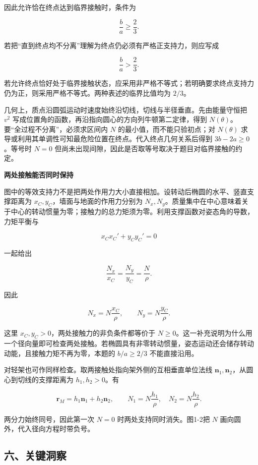 \documentclass[12pt,a4paper,UTF8]{ctexart}
\begin{document}
因此允许恰在终点达到临界接触时，条件为

\[\boxed{\frac ba\geq\frac23}.\]

若把``直到终点均不分离''理解为终点仍必须有严格正支持力，则应写成

\[\boxed{\frac ba>\frac23}.\]

若允许终点恰好处于临界接触状态，应采用非严格不等式；若明确要求终点支持力仍为正，则采用严格不等式。两种表述的临界比值均为
\(2/3\)。

几何上，质点沿圆弧运动时速度始终沿切线，切线与半径垂直。先由能量守恒把
\(v^2\) 写成位置角的函数，再沿指向圆心的方向列牛顿第二定律，得到
\(N(\theta)\)。要``全过程不分离''，必须求区间内 \(N\)
的最小值，而不能只验初点；对 \(N(\theta)\)
求导或利用其单调性可知最危险位置在终点。代入终点几何关系后得到
\(3b-2a\ge0\)。等号时 \(N=0\)
但尚未出现间隙，因此是否取等号取决于题目对临界接触的约定。

\textbf{两处接触能否同时保持}

图中的等效支持力不是把两处作用力大小直接相加。设转动后椭圆的水平、竖直支撑距离为
\(x_C,y_C\)，墙面与地面的作用力分别为
\(N_x,N_y\)。质量集中在中心意味着关于中心的转动惯量为零；接触力的总力矩须为零。利用支撑函数对姿态角的导数，力矩平衡与

\[x_Cx_C'+y_Cy_C'=0\]

一起给出

\[\frac{N_x}{x_C}=\frac{N_y}{y_C}=\frac N\rho.\]

因此

\[N_x=N\frac{x_C}{\rho},\qquad N_y=N\frac{y_C}{\rho}.\]

这里 \(x_C,y_C>0\)，两处接触力的非负条件都等价于
\(N\ge0\)。这一补充说明为什么用一个径向量即可检查两处接触。若椭圆具有非零转动惯量，姿态运动还会储存转动动能，且接触力矩不再为零，本题的
\(b/a\ge2/3\) 不能直接沿用。

对轻架也可作同样检查。取两接触处指向架外侧的互相垂直单位法线
\(\bm n_1,\bm n_2\)，从圆心到切线的支撑距离为 \(h_1,h_2>0\)。有

\[\bm r_M=h_1\bm n_1+h_2\bm n_2,\qquad
N_1=N\frac{h_1}{\rho},\quad N_2=N\frac{h_2}{\rho}.\]

两分力始终同号，因此第一次 \(N=0\) 时两处支持同时消失。图1-2把 \(N\)
画向圆外，代入径向方程时带负号。

\subsection{六、关键洞察}\label{ux516dux5173ux952eux6d1eux5bdf}
\end{document}
